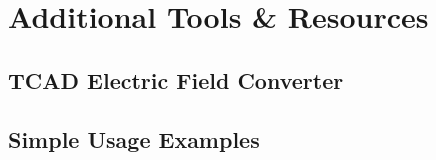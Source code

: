 \section{Additional Tools \& Resources}
\subsection{TCAD Electric Field Converter}
\subsection{Simple Usage Examples}
